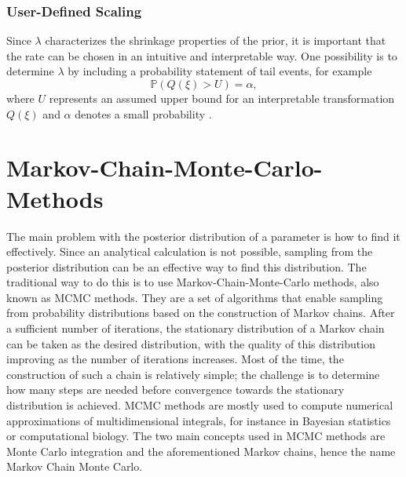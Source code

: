 \subsubsection*{User-Defined Scaling}
Since $\lambda$ characterizes the shrinkage properties of the prior, it is important that the rate can be chosen in an intuitive and interpretable way. One possibility is to determine $\lambda$ by including a probability statement of tail events, for example
\begin{equation}\label{eq:pcprior}
    \mathbb{P}\left(Q\left(\xi\right) > U\right)=\alpha,
\end{equation}
where $U$ represents an assumed upper bound for an interpretable transformation $Q\left(\xi\right)$ and $\alpha$ denotes a small probability \autocite[][]{sorbye2017penalised}.
\clearpage
\section{Markov-Chain-Monte-Carlo-Methods}
The main problem with the posterior distribution of a parameter is how to find it effectively. Since an analytical calculation is not possible, sampling from the posterior distribution can be an effective way to find this distribution. The traditional way to do this is to use Markov-Chain-Monte-Carlo methods, also known as MCMC methods. They are a set of algorithms that enable sampling from probability distributions based on the construction of Markov chains. After a sufficient number of iterations, the stationary distribution of a Markov chain can be taken as the desired distribution, with the quality of this distribution improving as the number of iterations increases. Most of the time, the construction of such a chain is relatively simple; the challenge is to determine how many steps are needed before convergence towards the stationary distribution is achieved. MCMC methods are mostly used to compute numerical approximations of multidimensional integrals, for instance in Bayesian statistics or computational biology. The two main concepts used in MCMC methods are Monte Carlo integration and the aforementioned Markov chains, hence the name Markov Chain Monte Carlo.
